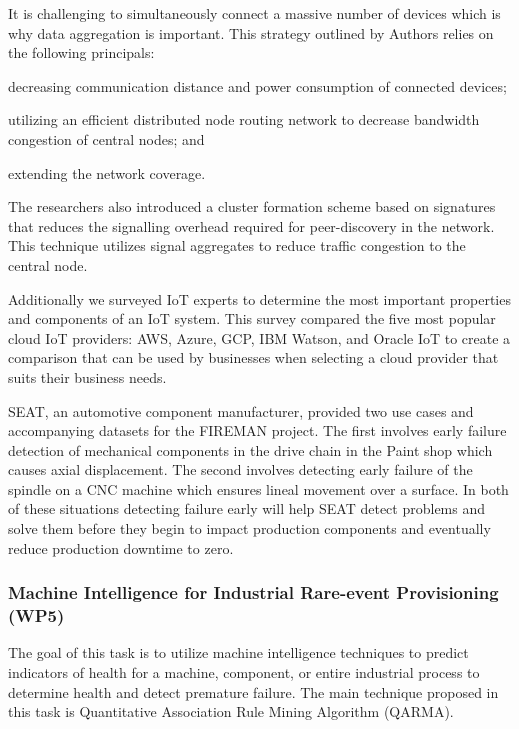 It is challenging to simultaneously connect a massive number of devices which is why data aggregation is important.
This strategy outlined by Authors \cite{massive-machine} relies on the following principals:
\begin{inlinelist}
  \item decreasing communication distance and power consumption of connected devices;
  \item utilizing an efficient distributed node routing network to decrease bandwidth congestion of central nodes; and
  \item extending the network coverage.
\end{inlinelist}
The researchers also introduced a cluster formation scheme based on signatures that reduces the signalling overhead required for peer-discovery in the network. This technique utilizes signal aggregates to reduce traffic congestion to the central node.

Additionally we surveyed IoT experts to determine the most important properties and components of an IoT system. This survey compared the five most popular cloud IoT providers: AWS, Azure, GCP, IBM Watson, and Oracle IoT to create a comparison that can be used by businesses when selecting a cloud provider that suits their business needs.

SEAT, an automotive component manufacturer, provided two use cases and accompanying datasets for the FIREMAN project. The first involves early failure detection of mechanical components in the drive chain in the Paint shop which causes axial displacement. The second involves detecting early failure of the spindle on a CNC machine which ensures lineal movement over a surface. In both of these situations detecting failure early will help SEAT detect problems and solve them before they begin to impact production components and eventually reduce production downtime to zero. 

\subsubsection{Machine Intelligence for Industrial Rare-event Provisioning (WP5)}

The goal of this task is to utilize machine intelligence techniques to predict indicators of health for a machine, component, or entire industrial process to determine health and detect premature failure. The main technique proposed in this task is Quantitative Association Rule Mining Algorithm (QARMA).


